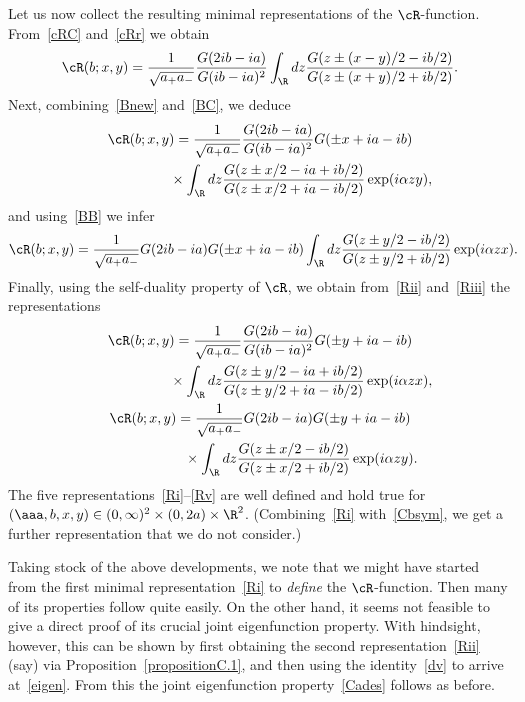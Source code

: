 Let us now collect the resulting minimal representations of the $\cR$-function. From~\eqref{cRC} and~\eqref{cRr} we obtain
\begin{gather}\label{Ri}
\cR(b;x,y)=\frac{1}{\sqrt{a_+a_-}}\frac{G(2ib-ia)}{G(ib-ia)^2}
\int_{\R}dz \frac{G(z\pm (x-y)/2-ib/2)}{G(z\pm (x+y)/2+ib/2)}.
\end{gather}
Next, combining~\eqref{Bnew} and~\eqref{BC}, we deduce
\begin{gather}
\cR(b;x,y)=\frac{1}{\sqrt{a_+a_-}}\frac{G(2ib-ia)}{G(ib-ia)^2}
G(\pm x +ia-ib)\nonumber\\
\phantom{\cR(b;x,y)=}{} \times
\int_{\R}dz\frac{G(z\pm x/2-ia+ib/2)}{G(z\pm x/2+ia-ib/2)}\exp(i\alpha zy),\label{Rii}
\end{gather}
and using~\eqref{BB} we infer
\begin{gather}\label{Riii}
\cR(b;x,y)=\frac{1}{\sqrt{a_+a_-}}G(2ib-ia)
G(\pm x +ia-ib)
\int_{\R}dz\frac{G(z\pm y/2-ib/2)}{G(z\pm y/2+ib/2)}\exp(i\alpha zx).\!\!\!
\end{gather}
Finally, using the self-duality property of $\cR$, we obtain from~\eqref{Rii} and~\eqref{Riii} the representations
\begin{gather}
\cR(b;x,y)=\frac{1}{\sqrt{a_+a_-}}\frac{G(2ib-ia)}{G(ib-ia)^2}
G(\pm y +ia-ib)\nonumber\\
\phantom{\cR(b;x,y)=}{}\times
\int_{\R}dz\frac{G(z\pm y/2-ia+ib/2)}{G(z\pm y/2+ia-ib/2)}\exp(i\alpha zx),\label{Riv}
\\
\cR(b;x,y)=\frac{1}{\sqrt{a_+a_-}}G(2ib-ia)
G(\pm y +ia-ib)\nonumber\\
\phantom{\cR(b;x,y)=}{}\times
\int_{\R}dz\frac{G(z\pm x/2-ib/2)}{G(z\pm x/2+ib/2)}\exp(i\alpha zy).\label{Rv}
\end{gather}
The f\/ive representations~\eqref{Ri}--\eqref{Rv} are well def\/ined and hold true for $(\aaa,b,x,y)\in(0,\infty)^2\times(0,2a)\times\R^2$. (Combining~\eqref{Ri} with~\eqref{Cbsym}, we get a further representation that we do not consider.)

Taking stock of the above developments, we note that we might have started from the f\/irst minimal representation~\eqref{Ri} to {\em define} the $\cR$-function. Then many of its properties follow quite easily. On the other hand, it seems not feasible to give a direct proof of its crucial joint eigenfunction property. With hindsight, however, this can be shown by f\/irst obtaining the second representation~\eqref{Rii} (say) via Proposition~\ref{propositionC.1}, and then using the identity~\eqref{dv} to arrive at~\eqref{eigen}. From this the joint eigenfunction property~\eqref{Cades} follows as before.

